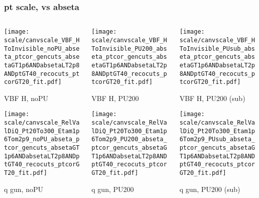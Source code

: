 \documentclass[8pt]{beamer}
\begin{document}
  \begin{frame}
  \frametitle{pt scale, vs abseta}
  
  \begin{columns}
   \begin{column}{0.35\textwidth}
     \texttt{[image: scale/canvscale\_VBF\_HToInvisible\_noPU\_abseta\_ptcor\_gencuts\_absetaGT1p6ANDabsetaLT2p8ANDptGT40\_recocuts\_ptcorGT20\_fit.pdf]}
     
     VBF H, noPU
    
     \texttt{[image: scale/canvscale\_RelValDiQ\_Pt20To300\_Etam1p6Tom2p9\_noPU\_abseta\_ptcor\_gencuts\_absetaGT1p6ANDabsetaLT2p8ANDptGT40\_recocuts\_ptcorGT20\_fit.pdf]}
     
     q gun, noPU
   \end{column}
   \begin{column}{0.35\textwidth}
     \texttt{[image: scale/canvscale\_VBF\_HToInvisible\_PU200\_abseta\_ptcor\_gencuts\_absetaGT1p6ANDabsetaLT2p8ANDptGT40\_recocuts\_ptcorGT20\_fit.pdf]}
     
     VBF H, PU200
    
     \texttt{[image: scale/canvscale\_RelValDiQ\_Pt20To300\_Etam1p6Tom2p9\_PU200\_abseta\_ptcor\_gencuts\_absetaGT1p6ANDabsetaLT2p8ANDptGT40\_recocuts\_ptcorGT20\_fit.pdf]}
     
     q gun, PU200
   \end{column}
   \begin{column}{0.35\textwidth}
     \texttt{[image: scale/canvscale\_VBF\_HToInvisible\_PUsub\_abseta\_ptcor\_gencuts\_absetaGT1p6ANDabsetaLT2p8ANDptGT40\_recocuts\_ptcorGT20\_fit.pdf]}
     
     VBF H, PU200 (sub)
    
     \texttt{[image: scale/canvscale\_RelValDiQ\_Pt20To300\_Etam1p6Tom2p9\_PUsub\_abseta\_ptcor\_gencuts\_absetaGT1p6ANDabsetaLT2p8ANDptGT40\_recocuts\_ptcorGT20\_fit.pdf]}
     
     q gun, PU200 (sub)
   \end{column}
  \end{columns}
 \end{frame}
 
\end{document}
